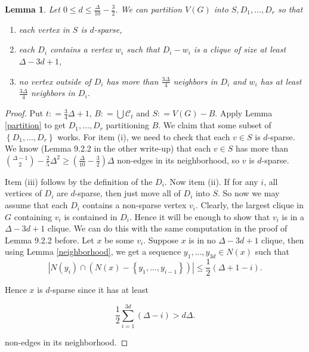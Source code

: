 \documentclass[12pt]{amsart}
\theoremstyle{plain}
\newtheorem{lem}[thm]{Lemma}
\theoremstyle{definition}
\theoremstyle{plain}
\newcommand{\fancy}[1]{\mathcal{#1}}
\newcommand{\CC}{\fancy{C}}
\newcommand{\set}[1]{\left\{ #1 \right\}}
\newcommand{\card}[1]{\left|#1\right|}
\newcommand{\DefinedAs}{\mathrel{\mathop:}=}
\begin{document}
\begin{lem}\label{improved}
Let $0 \leq d \leq \frac{\Delta}{10} - \frac32$. We can partition $V(G)$ into $S,D_1, \ldots, D_r$ so that

\begin{enumerate}
\item each vertex in $S$ is $d$-sparse,
\item each $D_i$ contains a vertex $w_i$ such that $D_i - w_i$ is a clique of size at least $\Delta - 3d + 1$,
\item no vertex outside of $D_i$ has more than $\frac{3\Delta}{4}$ neighbors in $D_i$ and $w_i$ has at least $\frac{3\Delta}{4}$ neighbors in $D_i$.
\end{enumerate}
\end{lem}
\begin{proof}
Put $t \DefinedAs \frac34 \Delta + 1$, $B \DefinedAs \bigcup \CC_t$ and $S \DefinedAs V(G) - B$. Apply Lemma \ref{partition} to get $D_1, \ldots, D_r$ partitioning $B$. We claim that some subset of $\set{D_1, \ldots, D_r}$ works.  For item (i), we need to check that each $v \in S$ is $d$-sparse.  We know (Lemma 9.2.2 in the other write-up) that each $v \in S$ has more than $\binom{\Delta-1}{2} - \frac25 \Delta^2 \geq ( \frac{\Delta}{10} - \frac32)\Delta$ non-edges in its neighborhood, so $v$ is $d$-sparse.

Item (iii) follows by the definition of the $D_i$.  Now item (ii).  If for any $i$, all vertices of $D_i$ are $d$-sparse, then just move all of $D_i$ into $S$.  So now we may assume that each $D_i$ contains a non-sparse vertex $v_i$.  Clearly, the largest clique in $G$ containing $v_i$ is contained in $D_i$.  Hence it will be enough to show that $v_i$ is in a $\Delta - 3d + 1$ clique.  We can do this with the same computation in the proof of Lemma 9.2.2 before.  Let $x$ be some $v_i$. Suppose $x$ is in no $\Delta - 3d + 1$ clique, then using Lemma \ref{neighborhood}, we get a sequence $y_1,
\ldots, y_{3d} \in N(x)$ such that 
\[\card{N(y_i) \cap (N(x) - \set{y_1, \ldots, y_{i-1}})} \leq \frac12 (\Delta + 1 - i).\]

Hence $x$ is $d$-sparse since it has at least 

\[\frac12\sum_{i=1}^{3d} (\Delta - i) > d\Delta.\]

non-edges in its neighborhood.
\end{proof}
\end{document}
